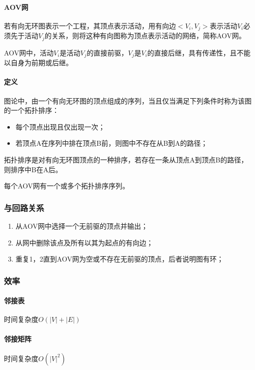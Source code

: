 \paragraph{AOV网}
若有向无环图表示一个工程，其顶点表示活动，用有向边\(<V_i, V_j>\)表示活动\(V_i\)必须先于活动\(V_j\)的关系，则将这种有向图称为顶点表示活动的网络，简称AOV网。

AOV网中，活动\(V_i\)是活动\(V_j\)的直接前驱，\(V_j\)是\(V_i\)的直接后继，具有传递性，且不能以自身为前期或后继。

\paragraph{定义}
图论中，由一个有向无环图的顶点组成的序列，当且仅当满足下列条件时称为该图的一个拓扑排序：
\begin{itemize}
    \item 每个顶点出现且仅出现一次；
    \item 若顶点A在序列中排在顶点B前，则图中不存在从B到A的路径；
\end{itemize}
拓扑排序是对有向无环图顶点的一种排序，若存在一条从顶点A到顶点B的路径，则排序中B在A后。

每个AOV网有一个或多个拓扑排序序列。

\subsubsection{与回路关系}

\begin{enumerate}
    \item 从AOV网中选择一个无前驱的顶点并输出；
    \item 从网中删除该点及所有以其为起点的有向边；
    \item 重复1，2直到AOV网为空或不存在无前驱的顶点，后者说明图有环；
\end{enumerate}

\subsubsection{效率}

\paragraph{邻接表}
时间复杂度\(O(|V| + |E|)\)

\paragraph{邻接矩阵}
时间复杂度\(O(|V|^2)\)

